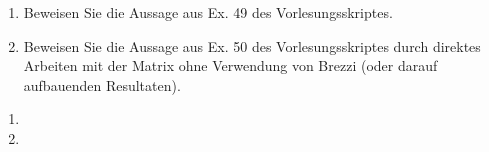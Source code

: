 
\begin{exercise}

\phantom{}

\begin{enumerate}[label = \textbf{\alph*)}]
  \item Beweisen Sie die Aussage aus Ex. 49 des Vorlesungsskriptes.
  \item Beweisen Sie die Aussage aus Ex. 50 des Vorlesungsskriptes
  durch direktes Arbeiten mit der Matrix ohne Verwendung von Brezzi
  (oder darauf aufbauenden Resultaten).
\end{enumerate}

\end{exercise}


\begin{solution}

\phantom{}

\begin{enumerate}[label = \textbf{\alph*)}]
  \item
  \item
\end{enumerate}

\end{solution}

